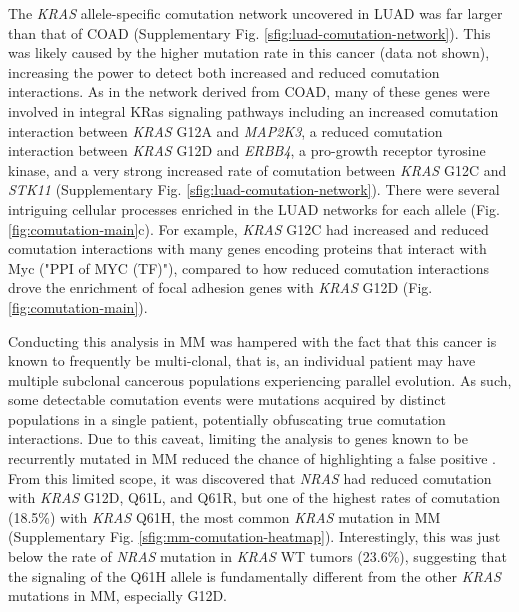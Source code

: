 \documentclass[english, 10pt, letterpaper]{article}
\newcommand{\KRAS}{\emph{KRAS}}
\newcommand{\kras}{KRas}
\begin{document}
The \KRAS{} allele-specific comutation network uncovered in LUAD was far larger than that of COAD (Supplementary Fig. \ref{sfig:luad-comutation-network}).
This was likely caused by the higher mutation rate in this cancer (data not shown), increasing the power to detect both increased and reduced comutation interactions.
As in the network derived from COAD, many of these genes were involved in integral \kras{} signaling pathways including an increased comutation interaction between \KRAS{} G12A and \emph{MAP2K3}, a reduced comutation interaction between \KRAS{} G12D and \emph{ERBB4}, a pro-growth receptor tyrosine kinase, and a very strong increased rate of comutation between \KRAS{} G12C and \emph{STK11} (Supplementary Fig. \ref{sfig:luad-comutation-network}).
There were several intriguing cellular processes enriched in the LUAD networks for each allele (Fig. \ref{fig:comutation-main}c).
For example, \KRAS{} G12C had increased and reduced comutation interactions with many genes encoding proteins that interact with Myc ("PPI of MYC (TF)"), compared to how reduced comutation interactions drove the enrichment of focal adhesion genes with \KRAS{} G12D (Fig. \ref{fig:comutation-main}).

Conducting this analysis in MM was hampered with the fact that this cancer is known to frequently be multi-clonal, that is, an individual patient may have multiple subclonal cancerous populations experiencing parallel evolution.
As such, some detectable comutation events were mutations acquired by distinct populations in a single patient, potentially obfuscating true comutation interactions.
Due to this caveat, limiting the analysis to genes known to be recurrently mutated in MM reduced the chance of highlighting a false positive \cite{Sondka2018, Lohr2014WidespreadTherapy.}.
From this limited scope, it was discovered that \emph{NRAS} had reduced comutation with \KRAS{} G12D, Q61L, and Q61R, but one of the highest rates of comutation (18.5\%) with \KRAS{} Q61H, the most common \KRAS{} mutation in MM (Supplementary Fig. \ref{sfig:mm-comutation-heatmap}).
Interestingly, this was just below the rate of \emph{NRAS} mutation in \KRAS{} WT tumors (23.6\%), suggesting that the signaling of the Q61H allele is fundamentally different from the other \KRAS{} mutations in MM, especially G12D.
\end{document}
